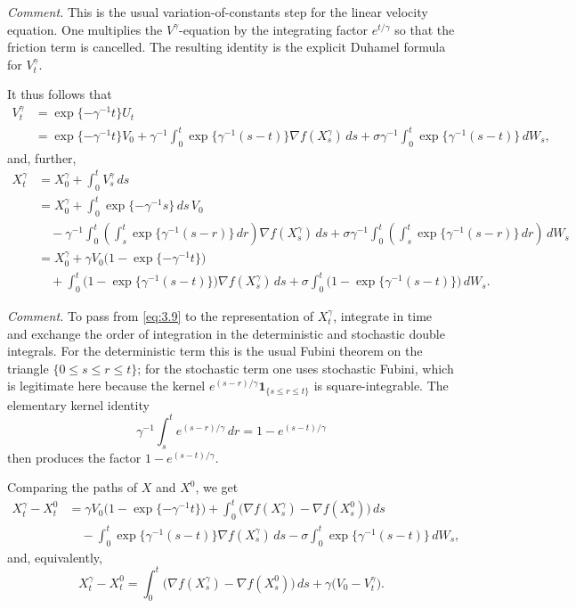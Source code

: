 \documentclass[11pt]{article}
\begin{document}
{\color{teal}
\noindent\emph{Comment.} This is the usual variation-of-constants step for the linear velocity equation. One multiplies the $V^\gamma$-equation by the integrating factor $e^{t/\gamma}$ so that the friction term is cancelled. The resulting identity is the explicit Duhamel formula for $V_t^\gamma$.
}

It thus follows that
\begin{equation}
\label{eq:3.9}
\begin{aligned}
V_t^{\gamma} &= \exp\{-\gamma^{-1}t\}U_t \\
&= \exp\{-\gamma^{-1}t\}V_0+\gamma^{-1}\int_0^t \exp\{\gamma^{-1}(s-t)\}\nabla f(X_s^{\gamma})\,ds+\sigma\gamma^{-1}\int_0^t \exp\{\gamma^{-1}(s-t)\}\,dW_s,
\end{aligned}
\end{equation}
and, further,
\[
\begin{aligned}
X_t^{\gamma} &= X_0^{\gamma}+\int_0^t V_s^{\gamma}\,ds \\
&= X_0^{\gamma}+\int_0^t \exp\{-\gamma^{-1}s\}\,ds\,V_0 \\
&\quad -\gamma^{-1}\int_0^t \left(\int_s^t \exp\{\gamma^{-1}(s-r)\}\,dr\right)\nabla f(X_s^{\gamma})\,ds+\sigma\gamma^{-1}\int_0^t \left(\int_s^t \exp\{\gamma^{-1}(s-r)\}\,dr\right)\,dW_s \\
&= X_0^{\gamma}+\gamma V_0\bigl(1-\exp\{-\gamma^{-1}t\}\bigr) \\
&\quad +\int_0^t \bigl(1-\exp\{\gamma^{-1}(s-t)\}\bigr)\nabla f(X_s^{\gamma})\,ds+\sigma\int_0^t \bigl(1-\exp\{\gamma^{-1}(s-t)\}\bigr)\,dW_s.
\end{aligned}
\]

{\color{teal}
\noindent\emph{Comment.} To pass from \eqref{eq:3.9} to the representation of $X_t^\gamma$, integrate in time and exchange the order of integration in the deterministic and stochastic double integrals. For the deterministic term this is the usual Fubini theorem on the triangle $\{0\le s\le r\le t\}$; for the stochastic term one uses stochastic Fubini, which is legitimate here because the kernel $e^{(s-r)/\gamma}\mathbf 1_{\{s\le r\le t\}}$ is square-integrable. The elementary kernel identity
\[
\gamma^{-1}\int_s^t e^{(s-r)/\gamma}\,dr
=1-e^{(s-t)/\gamma}
\]
then produces the factor $1-e^{(s-t)/\gamma}$.
}

Comparing the paths of $X$ and $X^0$, we get
\begin{equation}
\label{eq:3.10}
\begin{aligned}
X_t^{\gamma}-X_t^0
&= \gamma V_0\bigl(1-\exp\{-\gamma^{-1}t\}\bigr)+\int_0^t \bigl(\nabla f(X_s^{\gamma})-\nabla f(X_s^0)\bigr)\,ds \\
&\quad -\int_0^t \exp\{\gamma^{-1}(s-t)\}\nabla f(X_s^{\gamma})\,ds-\sigma\int_0^t \exp\{\gamma^{-1}(s-t)\}\,dW_s,
\end{aligned}
\end{equation}
and, equivalently,
\[
X_t^{\gamma}-X_t^0=\int_0^t \bigl(\nabla f(X_s^{\gamma})-\nabla f(X_s^0)\bigr)\,ds+\gamma\bigl(V_0-V_t^{\gamma}\bigr).
\]
\end{document}
